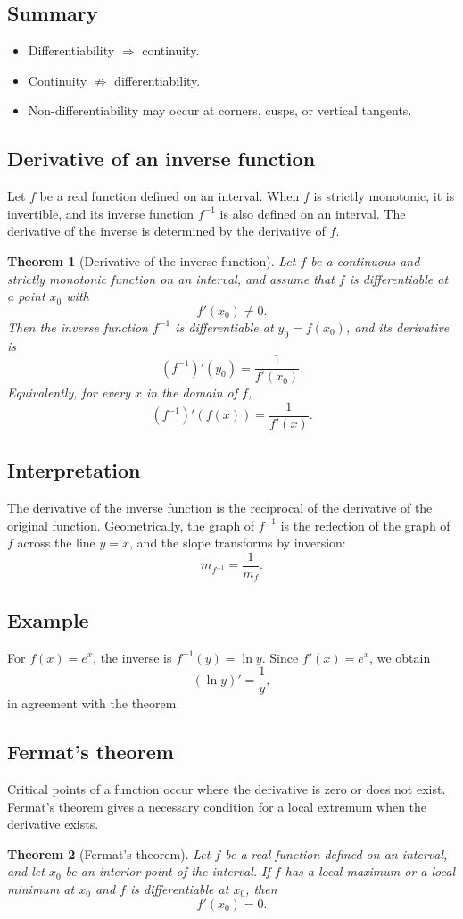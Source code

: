 \documentclass[11pt,a4paper]{article}
\theoremstyle{definition} \newtheorem{definition}{Definition} \theoremstyle{plain} \newtheorem{theorem}{Theorem}
\begin{document}
\subsection*{Summary}
\begin{itemize}
\item Differentiability $\Rightarrow$ continuity.
\item Continuity $\not\Rightarrow$ differentiability.
\item Non-differentiability may occur at corners, cusps, or vertical tangents. \end{itemize}
\subsection{Derivative of an inverse function}
Let $f$ be a real function defined on an interval.
When $f$ is strictly monotonic, it is invertible, and its inverse function $f^{-1}$ is also defined on an interval.
The derivative of the inverse is determined by the derivative of $f$.
\begin{theorem}[Derivative of the inverse function]\label{thm:derivative-inverse} Let $f$ be a continuous and strictly monotonic function on an interval, and assume that $f$ is differentiable at a point $x_0$ with
\[ f'(x_0) \neq 0. \]
Then the inverse function $f^{-1}$ is differentiable at $y_0 = f(x_0)$, and its derivative is
\[ (f^{-1})'(y_0) = \frac{1}{f'(x_0)}. \]
Equivalently, for every $x$ in the domain of $f$,
\[ (f^{-1})'(f(x)) = \frac{1}{f'(x)}. \]
\end{theorem}
\subsection*{Interpretation}
The derivative of the inverse function is the reciprocal of the derivative of the original function.
Geometrically, the graph of $f^{-1}$ is the reflection of the graph of $f$ across the line $y=x$, and the slope transforms by inversion:
\[ m_{f^{-1}} = \frac{1}{m_f}. \]
\subsection*{Example}
For $f(x)=e^x$, the inverse is $f^{-1}(y)=\ln y$.
Since $f'(x)=e^x$, we obtain
\[ (\ln y)' = \frac{1}{y}, \]
in agreement with the theorem.
\subsection{Fermat's theorem}
Critical points of a function occur where the derivative is zero or does not exist.
Fermat's theorem gives a necessary condition for a local extremum when the derivative exists.
\begin{theorem}[Fermat's theorem]\label{thm:fermat} Let $f$ be a real function defined on an interval, and let $x_0$ be an interior point of the interval.
If $f$ has a local maximum or a local minimum at $x_0$ and $f$ is differentiable at $x_0$, then
\[ f'(x_0) = 0. \]
\end{theorem}
\end{document}
